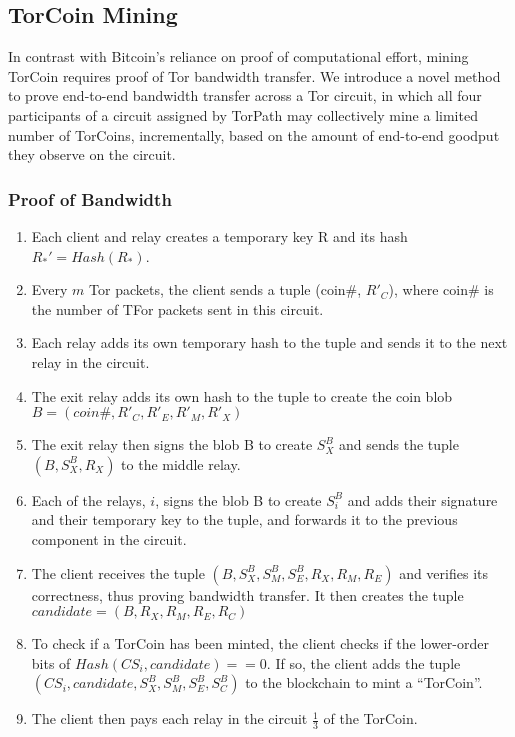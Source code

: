 \subsection{TorCoin Mining}

In contrast with Bitcoin's reliance on proof of computational effort,
mining TorCoin requires proof of Tor bandwidth transfer.
We introduce a novel method to
prove end-to-end bandwidth transfer across a Tor circuit,
in which all four participants of a circuit assigned by TorPath
may collectively mine a limited number of TorCoins, incrementally,
based on the amount of end-to-end goodput they observe on the circuit.



\subsubsection{Proof of Bandwidth}
\begin{enumerate}
\item
Each client and relay creates a temporary key R and its hash $R_*' = Hash(R_*)$. 

\item
Every $m$ Tor packets, the client sends a tuple (coin\#, $R'_C$), where 
coin\# is the number of TFor packets sent in this circuit.

\item
Each relay adds its own temporary hash to the tuple and sends it to the next
relay in the circuit.

\item
The exit relay adds its own hash to the tuple to create the coin blob 
$B = (coin\#, R'_{C}, R'_{E}, R'_{M}, R'_{X})$ 

\item
The exit relay then signs the blob B to create $S^B_X$ and sends the 
tuple $(B, S^B_X, R_X)$ to the middle relay.

\item
Each of the relays, $i$, signs the blob B to create $S^B_i$ and adds their 
signature and their temporary key to the tuple, and forwards it to the previous 
component in the circuit. 

\item
The client receives the tuple $(B, S^B_X, S^B_M, S^B_E, R_X, R_M,
R_E)$ and verifies its correctness, thus proving bandwidth transfer. It then
creates the tuple $candidate = (B, R_X, R_M, R_E, R_C)$

\item
To check if a TorCoin has been minted, the client checks if the lower-order
bits of $Hash(CS_i, candidate) == 0$. If so, the client adds the tuple
$(CS_i, candidate, S^B_X, S^B_M, S^B_E, S^B_C)$ to the blockchain to mint a ``TorCoin''.

\item
The client then pays each relay in the circuit $\frac{1}{3}$ of the TorCoin. 
\end{enumerate}

